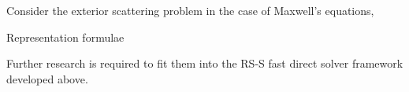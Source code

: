 Consider the exterior scattering problem in the case of Maxwell's equations,


Representation formulae

Further research is required to fit them into the RS-S fast direct solver framework developed above.
